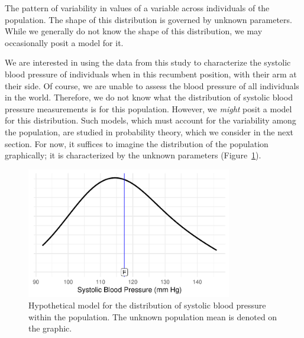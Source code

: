 \documentclass[
  letterpaper,
  DIV=11,
  numbers=noendperiod]{scrreprt}
\theoremstyle{definition}
\theoremstyle{definition}
\theoremstyle{remark}
\begin{document}
\begin{tcolorbox}[enhanced jigsaw, left=2mm, toprule=.15mm, arc=.35mm, breakable, opacitybacktitle=0.6, opacityback=0, rightrule=.15mm, colbacktitle=quarto-callout-important-color!10!white, coltitle=black, leftrule=.75mm, toptitle=1mm, colframe=quarto-callout-important-color-frame, titlerule=0mm, title=\textcolor{quarto-callout-important-color}{\faExclamation}\hspace{0.5em}{Distribution of the Population}, bottomrule=.15mm, colback=white, bottomtitle=1mm]

The pattern of variability in values of a variable across individuals of
the population. The shape of this distribution is governed by unknown
parameters. While we generally do not know the shape of this
distribution, we may occasionally posit a model for it.

\end{tcolorbox}

We are interested in using the data from this study to characterize the
systolic blood pressure of individuals when in this recumbent position,
with their arm at their side. Of course, we are unable to assess the
blood pressure of all individuals in the world. Therefore, we do not
know what the distribution of systolic blood pressure measurements is
for this population. However, we \emph{might} posit a model for this
distribution. Such models, which must account for the variability among
the population, are studied in probability theory, which we consider in
the next section. For now, it suffices to imagine the distribution of
the population graphically; it is characterized by the unknown
parameters (Figure~\ref{fig-distributional-quartet-population}).

\begin{figure}

{\centering \includegraphics[width=0.8\textwidth,height=\textheight]{./images/fig-distributional-quartet-population-1.pdf}

}

\caption{\label{fig-distributional-quartet-population}Hypothetical model
for the distribution of systolic blood pressure within the population.
The unknown population mean is denoted on the graphic.}

\end{figure}
\end{document}
